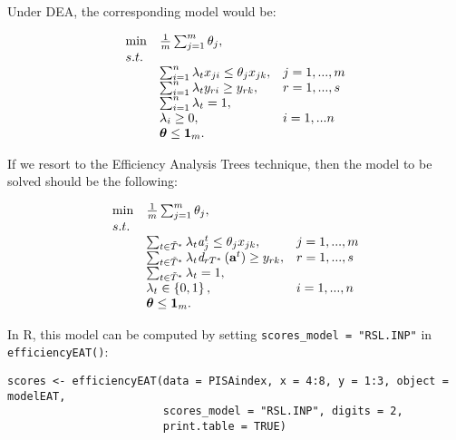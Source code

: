 Under DEA, the corresponding model would be:

\begin{equation} \label{(24)} 
\begin{array}{lllll} 
{} & {\min } & {\frac{1}{m} \sum_{j=1}^{m}\theta_{j},} & {} & {} \\ 
{} & {s.t.} & {} & {} & {} \\ 
{} & {} & {\sum_{i=1}^{n}\lambda_{t} x_{ji}  \le \theta_{j} x_{jk} ,} & {j=1,...,m} & {} \\ 
{} & {} & {\sum_{i=1}^{n}\lambda_{t} y_{ri}  \ge y_{rk} ,} & {r=1,...,s} & {} \\ 
{} & {} & {\sum_{i=1}^{n}\lambda_{t}=1,} & {} & {} \\ 
{} & {} & {\lambda _{i} \ge 0,} & {i=1,...n} & {} \\ 
{} & {} & {{\it \boldsymbol{\theta}}\le {\bf 1}_{m}.}  
\end{array}
\end{equation}

If we resort to the Efficiency Analysis Trees technique, then the model to be solved should be the following:

\begin{equation} \label{(25)} 
\begin{array}{lllll} 
{} & {\min } & {\frac{1}{m} \sum_{j=1}^{m}\theta_{j},  } & {} & {} \\ 
{} & {s.t.} & {} & {} & {} \\ 
{} & {} & {\sum_{t\in \tilde{T}^{*} }^{}\lambda_{t} {\it a}_{j}^{t}  \le \theta_{j} x_{jk} ,} & {j=1,...,m} & {} \\ 
{} & {} & {\sum_{t\in \tilde{T}^{*} }^{}\lambda_{t} {\it d}_{rT^{*}} \left({\it \textbf{a}}^{t} \right) \ge y_{rk} ,} & {r=1,...,s} & {} \\ 
{} & {} & {\sum_{t\in \tilde{T}^{*} }^{}\lambda_{t}=1,} & {} & {} \\ 
{} & {} & {\lambda _{t} \in \left\{0,1\right\},} & {i=1,...,n} & {} \\ 
{} & {} & {{\it \boldsymbol{\theta}}\le {\bf 1}_{m}.}
\end{array} 
\end{equation}

In R, this model can be computed by setting \texttt{scores\_model\ =\ "RSL.INP"} in \texttt{efficiencyEAT()}:

\begin{verbatim}
scores <- efficiencyEAT(data = PISAindex, x = 4:8, y = 1:3, object = modelEAT, 
                        scores_model = "RSL.INP", digits = 2, 
                        print.table = TRUE)
\end{verbatim}

